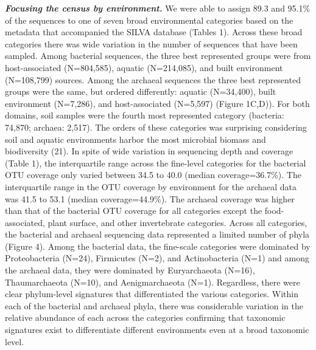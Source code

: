 \documentclass[11pt,]{article}
\begin{document}
\textbf{\emph{Focusing the census by environment.}} We were able to
assign 89.3 and 95.1\% of the sequences to one of seven broad
environmental categories based on the metadata that accompanied the
SILVA database (Tables 1). Across these broad categories there was wide
variation in the number of sequences that have been sampled. Among
bacterial sequences, the three best represented groups were from
host-associated (N=804,585), aquatic (N=214,085), and built environment
(N=108,799) sources. Among the archaeal sequences the three best
represented groups were the same, but ordered differently: aquatic
(N=34,400), built environment (N=7,286), and host-associated (N=5,597)
(Figure 1C,D)). For both domains, soil samples were the fourth most
represented category (bacteria: 74,870; archaea: 2,517). The orders of
these categories was surprising considering soil and aquatic
environments harbor the most microbial biomass and biodiversity (21). In
spite of wide variation in sequencing depth and coverage (Table 1), the
interquartile range across the fine-level categories for the bacterial
OTU coverage only varied between 34.5 to 40.0 (median coverage=36.7\%).
The interquartile range in the OTU coverage by environment for the
archaeal data was 41.5 to 53.1 (median coverage=44.9\%). The archaeal
coverage was higher than that of the bacterial OTU coverage for all
categories except the food-associated, plant surface, and other
invertebrate categories. Across all categories, the bacterial and
archaeal sequencing data represented a limited number of phyla (Figure
4). Among the bacterial data, the fine-scale categories were dominated
by Proteobacteria (N=24), Firmicutes (N=2), and Actinobacteria (N=1) and
among the archaeal data, they were dominated by Euryarchaeota (N=16),
Thaumarchaeota (N=10), and Aenigmarchaeota (N=1). Regardless, there were
clear phylum-level signatures that differentiated the various
categories. Within each of the bacterial and archaeal phyla, there was
considerable variation in the relative abundance of each across the
categories confirming that taxonomic signatures exist to differentiate
different environments even at a broad taxonomic level.
\end{document}
